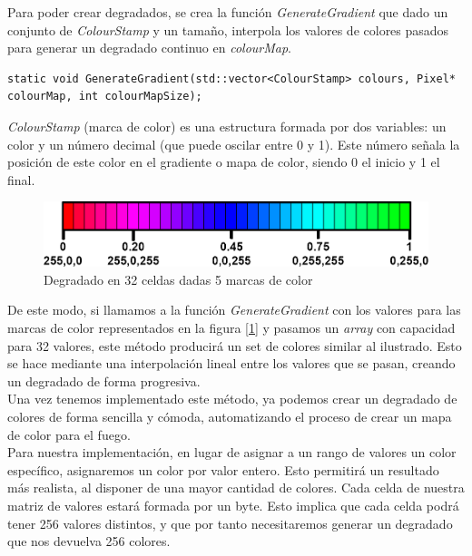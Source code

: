 Para poder crear degradados, se crea la función \emph{GenerateGradient} que dado un conjunto de \emph{ColourStamp} y un tamaño, interpola los valores de colores pasados para generar un degradado continuo en \emph{colourMap}.\\

\begin{lstlisting}[style=C-color, caption={Método para crear gradientes de color},label=cod:generateGradient]
static void GenerateGradient(std::vector<ColourStamp> colours, Pixel* colourMap, int colourMapSize);
\end{lstlisting}

\emph{ColourStamp} (marca de color) es una estructura formada por dos variables: un color y un número decimal (que puede oscilar entre 0 y 1). Este número señala la posición de este color en el gradiente o mapa de color, siendo 0 el inicio y 1 el final. 

\begin{figure}[h]
	\centering
	\includegraphics[width=12cm]{archivos/colourGradient}
	\caption{Degradado en 32 celdas dadas 5 marcas de color}
	\label{fig:colourGradient}
\end{figure}

De este modo, si llamamos a la función \emph{GenerateGradient} con los valores para las marcas de color representados en la figura [\ref{fig:colourGradient}] y pasamos un \emph{array} con capacidad para 32 valores, este método producirá un set de colores similar al ilustrado. Esto se hace mediante una interpolación lineal entre los valores que se pasan, creando un degradado de forma progresiva.\\

Una vez tenemos implementado este método, ya podemos crear un degradado de colores de forma sencilla y cómoda, automatizando el proceso de crear un mapa de color para el fuego.\\

Para nuestra implementación, en lugar de asignar a un rango de valores un color específico, asignaremos un color por valor entero. Esto permitirá un resultado más realista, al disponer de una mayor cantidad de colores. Cada celda de nuestra matriz de valores estará formada por un byte. Esto implica que cada celda podrá tener 256 valores distintos, y que por tanto necesitaremos generar un degradado que nos devuelva 256 colores.\\


